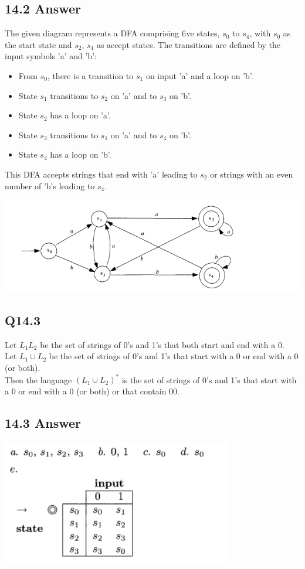 \documentclass{article}
\begin{document}
\subsection*{14.2 Answer}
The given diagram represents a DFA comprising five states, \( s_0 \) to \( s_4 \), with \( s_0 \) as the start state and \( s_2 \), \( s_4 \) as accept states. The transitions are defined by the input symbols 'a' and 'b':
\begin{itemize}
    \item From \( s_0 \), there is a transition to \( s_1 \) on input 'a' and a loop on 'b'.
    \item State \( s_1 \) transitions to \( s_2 \) on 'a' and to \( s_3 \) on 'b'.
    \item State \( s_2 \) has a loop on 'a'.
    \item State \( s_3 \) transitions to \( s_1 \) on 'a' and to \( s_4 \) on 'b'.
    \item State \( s_4 \) has a loop on 'b'.
\end{itemize}
This DFA accepts strings that end with 'a' leading to \( s_2 \) or strings with an even number of 'b's leading to \( s_4 \).
\begin{center}
    \includegraphics[width=15cm]{1.png}
\end{center}
\newpage
\subsection*{Q14.3}
Let \( L_1L_2 \) be the set of strings of 0's and 1's that both start and end with a 0.
\\ Let \( L_1 \cup L_2 \) be the set of strings of 0's and 1's that start with a 0 or end with a 0 (or both).
\\ Then the language \( (L_1 \cup L_2)^* \) is the set of strings of 0's and 1's that start with a 0 or end with a 0 (or both) or that contain 00.
\newpage
\subsection*{14.3 Answer}
\begin{center}
    \includegraphics[width=10cm]{2.png}
\end{center}
\newpage
\end{document}
